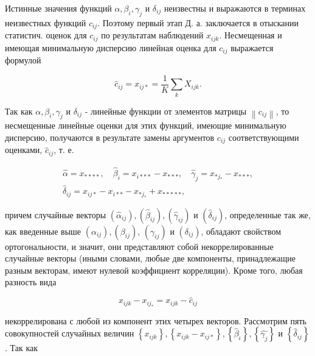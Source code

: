 \documentclass[10pt]{article}
\begin{document}
Истинные значения функций $\alpha, \beta_{i}, \gamma_{j}$ и $\delta_{i j}$ неизвестны и выражаются в терминах неизвестных функций $c_{i j}$. Поэтому первый этап Д. а. заключается в отыскании статистич. оценок для $c_{i j}$ по результатам наблюдений $x_{i j k}$. Несмещенная и имеющая минимальную дисперсию линейная оценка для $c_{i j}$ выражается формулой



\[

\hat{c}_{i j}=x_{i j *}=\frac{1}{K} \sum_{k} X_{i j k} .

\]



Так как $\alpha, \beta_{i}, \gamma_{j}$ и $\delta_{i j}$ - линейные функции от элементов матрицы $\left\|c_{i j}\right\|$, то несмещенные линейные оценки для этих функций, имеющие минимальную дисперсию, получаются в результате замены аргументов $c_{i j}$ соответствующими оценками, $\hat{c}_{i j}$, т. е.



\[

\begin{gathered}

\hat{\alpha}=x_{* * * *}, \quad \hat{\beta}_{i}=x_{i * * *}-x_{* * *}, \quad \hat{\gamma}_{j}=x_{* j_{*}}-x_{* * *}, \\

\hat{\delta}_{i j}=x_{i j *}-x_{i * *}-x_{* j_{*}}+x_{* * * * *},

\end{gathered}

\]



причем случайные векторы $\left(\hat{\alpha}_{i j}\right),\left(\hat{\beta}_{i j}\right),\left(\hat{\gamma}_{i j}\right)$ и $\left(\hat{\delta}_{i j}\right)$, определенные так же, как введенные выше $\left(\alpha_{i j}\right),\left(\beta_{i j}\right)$, $\left(\gamma_{i j}\right)$ и $\left(\delta_{i j}\right)$, обладают свойством ортогональности, и значит, они представляют собой некоррелированные случайные векторы (иными словами, любые две компоненты, принадлежащие разным векторам, имеют нулевой коэффициент корреляции). Кроме того, любая разность вида



\[

x_{i j k}-x_{i j_{*}}=x_{i j k}-\hat{c}_{i j}

\]



некоррелирована с любой из компонент этих четырех векторов. Рассмотрим пять совокупностей случайных величин $\left\{x_{i j k}\right\},\left\{x_{i j k}-x_{i j *}\right\},\left\{\hat{\beta}_{i}\right\},\left\{\hat{\gamma_{j}}\right\}$ и $\left\{\hat{\delta}_{i j}\right\}$. Так как
\end{document}
